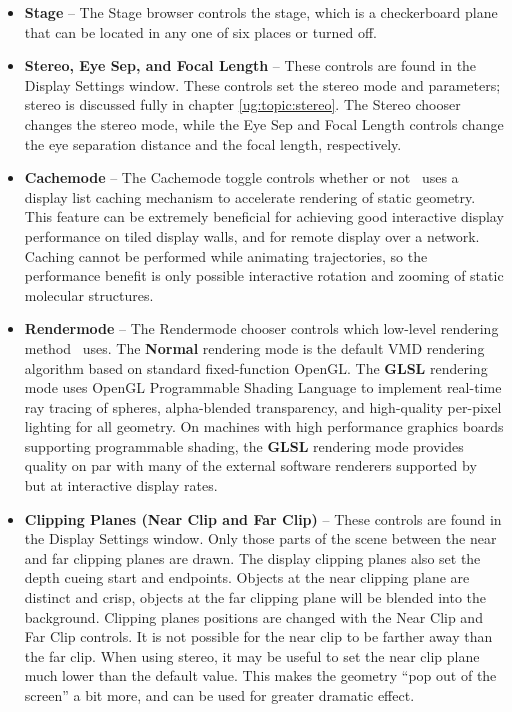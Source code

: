 \begin{itemize}
  \item {\bf Stage} --
The {\sf Stage} browser controls the stage, which is a checkerboard plane
that can be located in any one of six places or turned off.

  \item {\bf Stereo, Eye Sep, and Focal Length} --
\label{ug:ui:window:stereo}
These controls are found in the {\sf Display Settings} window.
These controls set the stereo mode and parameters; stereo is discussed
fully in
chapter \ref{ug:topic:stereo}.
The {\sf Stereo} chooser changes the stereo mode, while the {\sf Eye Sep}
and {\sf Focal Length} controls change the eye separation distance and the
focal length, respectively.

  \item {\bf Cachemode} --
The {\sf Cachemode} toggle controls whether or not \VMD\ uses
a display list caching mechanism to accelerate rendering of 
static geometry.  This feature can be extremely beneficial for
achieving good interactive display performance on tiled display walls,
and for remote display over a network.  Caching cannot be performed
while animating trajectories, so the performance benefit is only possible
interactive rotation and zooming of static molecular structures.

  \item {\bf Rendermode} --
The {\sf Rendermode} chooser controls which low-level rendering method
\VMD\ uses.  The {\bf Normal} rendering mode is the default VMD rendering
algorithm based on standard fixed-function OpenGL.  The {\bf GLSL} 
rendering mode uses OpenGL Programmable Shading Language to implement
real-time ray tracing of spheres, alpha-blended transparency,
and high-quality per-pixel lighting for all geometry.  On machines
with high performance graphics boards supporting programmable shading,
the {\bf GLSL} rendering mode provides quality on par with many of
the external software renderers supported by \VMD\, but at interactive 
display rates.

\item {\bf Clipping Planes (Near Clip and Far Clip)} --
These controls are found in the {\sf Display Settings} window.
Only those parts of the scene between the near and far clipping planes 
are drawn.  
The display clipping planes also set the depth cueing start and endpoints.
Objects at the near clipping plane are distinct and crisp, 
objects at the far clipping plane will be blended into the background.
Clipping planes positions are changed with the {\sf Near Clip} 
and {\sf Far Clip} controls.  It is not possible for the near
clip to be farther away than the far clip.  When using stereo, it may
be useful to set the near clip plane much lower than the default value.
This makes the geometry ``pop out of the screen'' a bit more, 
and can be used for greater dramatic effect.


\end{itemize}
